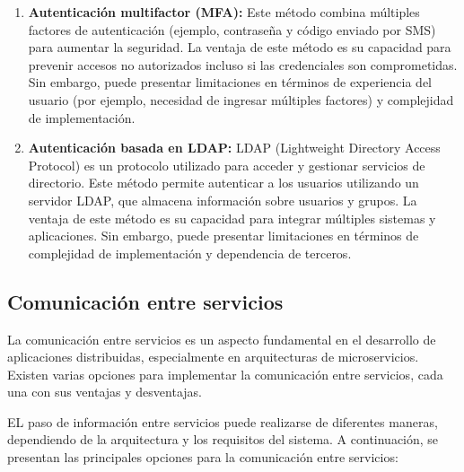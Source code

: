 \begin{enumerate}
    \item \textbf{Autenticación multifactor (MFA):} Este método combina múltiples factores de autenticación (ejemplo, contraseña y código enviado por SMS) para aumentar la seguridad. La ventaja de este método es su capacidad para prevenir accesos no autorizados incluso si las credenciales son comprometidas. Sin embargo, puede presentar limitaciones en términos de experiencia del usuario (por ejemplo, necesidad de ingresar múltiples factores) y complejidad de implementación.
    \item \textbf{Autenticación basada en LDAP:} LDAP (Lightweight Directory Access Protocol) es un protocolo utilizado para acceder y gestionar servicios de directorio. Este método permite autenticar a los usuarios utilizando un servidor LDAP, que almacena información sobre usuarios y grupos. La ventaja de este método es su capacidad para integrar múltiples sistemas y aplicaciones. Sin embargo, puede presentar limitaciones en términos de complejidad de implementación y dependencia de terceros.    
\end{enumerate}

\subsection{Comunicación entre servicios}

La comunicación entre servicios es un aspecto fundamental en el desarrollo de aplicaciones distribuidas, especialmente en arquitecturas de microservicios. Existen varias opciones para implementar la comunicación entre servicios, cada una con sus ventajas y desventajas.\newline

EL paso de información entre servicios puede realizarse de diferentes maneras, dependiendo de la arquitectura y los requisitos del sistema. A continuación, se presentan las principales opciones para la comunicación entre servicios:

